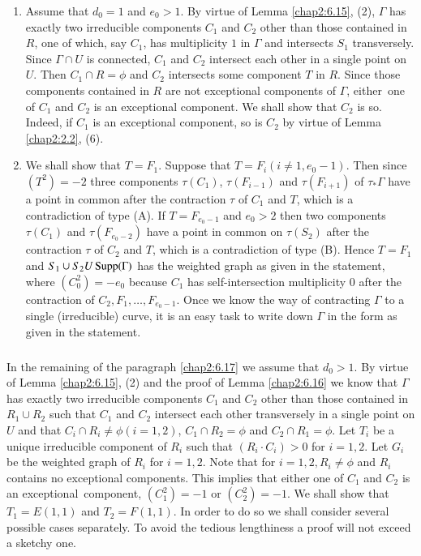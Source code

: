 \begin{enumerate}
\renewcommand{\theenumi}{\Roman{enumi}}
\renewcommand{\labelenumi}{(\theenumi)}
\item Assume that $d_{0}=1$ and $e_{0}>1$. By virtue of Lemma
  \ref{chap2:6.15}, (2), $\Gamma$ has exactly two irreducible components
  $C_{1}$ and $C_{2}$ other than those contained in $R$, one of which,
  say $C_{1}$, has multiplicity $1$ in $\Gamma$ and intersects $S_{1}$
  transversely. Since $\Gamma\cap U$ is connected, $C_{1}$ and
  $C_{2}$ intersect each other in a single point on $U$. Then
  $C_{1}\cap R=\phi$ and $C_{2}$ intersects some component $T$ in
  $R$. Since those components contained in $R$ are not exceptional
  components of $\Gamma$, either\pageoriginale\ one of $C_{1}$ and
  $C_{2}$ is an exceptional component. We shall show that $C_{2}$ is
  so. Indeed, if $C_{1}$ is an exceptional component, so is $C_{2}$ by
  virtue of Lemma \ref{chap2:2.2}, (6).

\item We shall show that $T=F_{1}$. Suppose that $T=F_{i}(i\neq 1,
  e_{0}-1)$. Then since $(T^{2})=-2$ three components $\tau(C_{1})$,
  $\tau(F_{i-1})$ and $\tau(F_{i+1})$ of $\tau_{\ast}\Gamma$ have a
  point in common after the contraction $\tau$ of $C_{1}$ and $T$,
  which is a contradiction of type (A). If $T=F_{e_{0}-1}$ and
  $e_{0}>2$ then two components $\tau(C_{1})$ and $\tau(F_{e_{0}-2})$
  have a point in common on $\tau(S_{2})$ after the contraction $\tau$
  of $C_{2}$ and $T$, which is a contradiction of type (B). Hence
  $T=F_{1}$ and $S_{1}\cup S_{2}U\operatorname{Supp}(\Gamma)$ has the weighted graph
  as given in the statement, where $(C^{2}_{0})=-e_{0}$ because
  $C_{1}$ has self-intersection multiplicity $0$ after the contraction
  of $C_{2},F_{1},\ldots,F_{e_{0}-1}$. Once we know the way of
  contracting $\Gamma$ to a single (irreducible) curve, it is an easy
  task to write down $\Gamma$ in the form as given in the statement.
\end{enumerate}

\subsubsection{}\label{chap2:6.17.2}
In the remaining of the paragraph \ref{chap2:6.17} we assume that
$d_{0}>1$. By virtue of Lemma \ref{chap2:6.15}, (2) and the proof of
Lemma \ref{chap2:6.16} we know that $\Gamma$ has exactly two irreducible
components $C_{1}$ and $C_{2}$ other than those contained in
$R_{1}\cup R_{2}$ such that $C_{1}$ and $C_{2}$ intersect each other
transversely in a single point on $U$ and that $C_{i}\cap R_{i}\neq
\phi(i=1,2)$, $C_{1}\cap R_{2}=\phi$ and $C_{2}\cap R_{1}=\phi$. Let
$T_{i}$ be a unique irreducible component of $R_{i}$ such that
$(R_{i}\cdot C_{i})>0$ for $i=1,2$. Let $G_{i}$ be the weighted graph
of $R_{i}$ for $i=1,2$. Note that for $i=1,2,R_{i}\neq \phi$ and
$R_{i}$ contains no exceptional components. This implies that either
one of $C_{1}$ and $C_{2}$ is an exceptional\pageoriginale\ component,
\iec $(C^{2}_{1})=-1$ or $(C^{2}_{2})=-1$. We shall show that
$T_{1}=E(1,1)$ and $T_{2}=F(1,1)$. In order to do so we shall consider
several possible cases separately. To avoid the tedious lengthiness a
proof will not exceed a sketchy one.

